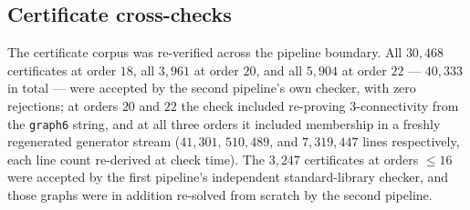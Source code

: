 \documentclass[11pt]{amsart}
\theoremstyle{plain}
\theoremstyle{definition}
\theoremstyle{remark}
\begin{document}
\subsection{Certificate cross-checks}\label{ssec:certcheck}
The certificate corpus was re-verified across the pipeline boundary. All
$30{,}468$ certificates at order $18$, all $3{,}961$ at order $20$, and
all $5{,}904$ at order $22$ --- $40{,}333$ in total --- were accepted by
the second pipeline's own checker, with zero rejections; at orders $20$
and $22$ the check included re-proving $3$-connectivity from the
\texttt{graph6} string, and at all three orders it included membership in
a freshly regenerated generator stream ($41{,}301$, $510{,}489$, and
$7{,}319{,}447$ lines respectively, each line count re-derived at check
time). The $3{,}247$ certificates at orders $\le 16$ were accepted by the
first pipeline's independent standard-library checker, and those graphs
were in addition re-solved from scratch by the second pipeline.
\end{document}
